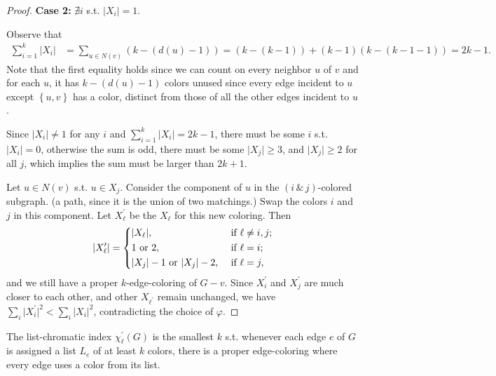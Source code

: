 \begin{proof}
    \textbf{Case 2:} \(\nexists i\) s.t. \(\vert X_i \vert = 1 \). 

    Observe that 
    \begin{align*}
        \sum_{i=1}^k \vert X_i \vert &= \sum_{u \in N(v)} \left( k - (d(u) - 1) \right) = \left( k - (k - 1) \right) + (k - 1) (k - (k - 1 - 1)) = 2k - 1.     
    \end{align*}     
    Note that the first equality holds since we can count on every neighbor \(u\) of \(v\) and for each \(u\), it has \(k - (d(u) - 1)\) colors unused since every edge incident to \(u\) except \(\left\{ u, v \right\} \) has a color, distinct from those of all the other edges incident to \(u\). 

    Since \(\vert X_i \vert \neq 1 \) for any \(i\) and \(\sum_{i=1}^k \vert X_i \vert = 2k - 1  \), there must be some \(i\) s.t. \(\vert X_i \vert = 0 \), otherwise the sum is odd, there must be some \(\vert X_j \vert \ge 3 \), and \(\vert X_j \vert \ge 2 \) for all \(j\), which implies the sum must be larger than \(2k + 1\).

    Let \(u \in N(v)\) s.t. \(u \in X_j\). Consider the component of \(u\) in the \((i \, \& \, j)\)-colored subgraph. (a path, since it is the union of two matchings.) Swap the colors \(i\) and \(j\) in this component. Let \(X_{\ell }^{\prime} \) be the \(X_{\ell }\) for this new coloring. Then 
    \[
        \vert X_{\ell }^{\prime}  \vert = \begin{dcases}
            \vert X_{\ell} \vert , &\text{ if } \ell \neq i, j ;\\
            1 \text{ or } 2 , &\text{ if } \ell = i ;\\
            \vert X_j \vert - 1 \text{ or } \vert X_j \vert - 2   , &\text{ if } \ell = j,
        \end{dcases}
    \]              
    and we still have a proper \(k\)-edge-coloring of \(G - v\). Since \(X_i^{\prime} \) and \(X_j^{\prime} \) are much closer to each other, and other \(X_{\ell ^{\prime} } \) remain unchanged, we have \(\sum_{i} \vert X_i^{\prime}  \vert^2 < \sum_{i} \vert X_i \vert^2    \), contradicting the choice of \(\varphi \).                             
\end{proof}

\begin{definition}
    The list-chromatic index \(\chi _\ell ^{\prime} (G)\) is the smallest \(k\) s.t. whenever each edge \(e\) of \(G\) is assigned a list \(L_e\) of at least \(k\) colors, there is a proper edge-coloring where every edge uses a color from its list.     
\end{definition}

